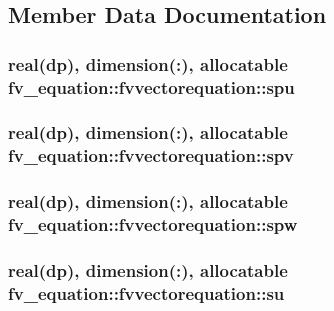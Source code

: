 \subsection{Member Data Documentation}
\hypertarget{structfv__equation_1_1fvvectorequation_a7f44e6ac5ffa1baa495dd13137ef8be7}{
\subsubsection[{spu}]{\setlength{\rightskip}{0pt plus 5cm}real(dp), dimension(\-:), allocatable fv\-\_\-equation\-::fvvectorequation\-::spu}}\label{structfv__equation_1_1fvvectorequation_a7f44e6ac5ffa1baa495dd13137ef8be7}
\hypertarget{structfv__equation_1_1fvvectorequation_a33b72db8fdfb8122c72fe2e5a9593eb1}{
\subsubsection[{spv}]{\setlength{\rightskip}{0pt plus 5cm}real(dp), dimension(\-:), allocatable fv\-\_\-equation\-::fvvectorequation\-::spv}}\label{structfv__equation_1_1fvvectorequation_a33b72db8fdfb8122c72fe2e5a9593eb1}
\hypertarget{structfv__equation_1_1fvvectorequation_aa15bb4a30555344af9fdb0817b411544}{
\subsubsection[{spw}]{\setlength{\rightskip}{0pt plus 5cm}real(dp), dimension(\-:), allocatable fv\-\_\-equation\-::fvvectorequation\-::spw}}\label{structfv__equation_1_1fvvectorequation_aa15bb4a30555344af9fdb0817b411544}
\hypertarget{structfv__equation_1_1fvvectorequation_ad955a3b8ed3260f8f97d94515f95a9b5}{
\subsubsection[{su}]{\setlength{\rightskip}{0pt plus 5cm}real(dp), dimension(\-:), allocatable fv\-\_\-equation\-::fvvectorequation\-::su}}\label{structfv__equation_1_1fvvectorequation_ad955a3b8ed3260f8f97d94515f95a9b5}
